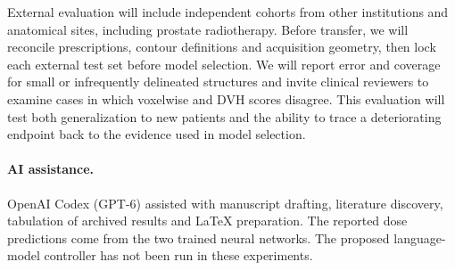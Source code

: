 \documentclass[letterpaper]{article}
\begin{document}
External evaluation will include independent cohorts from other institutions and anatomical sites, including prostate radiotherapy. Before transfer, we will reconcile prescriptions, contour definitions and acquisition geometry, then lock each external test set before model selection. We will report error and coverage for small or infrequently delineated structures and invite clinical reviewers to examine cases in which voxelwise and DVH scores disagree. This evaluation will test both generalization to new patients and the ability to trace a deteriorating endpoint back to the evidence used in model selection.

\paragraph{AI assistance.} OpenAI Codex (GPT-6) assisted with manuscript drafting, literature discovery, tabulation of archived results and LaTeX preparation. The reported dose predictions come from the two trained neural networks. The proposed language-model controller has not been run in these experiments.


\end{document}
